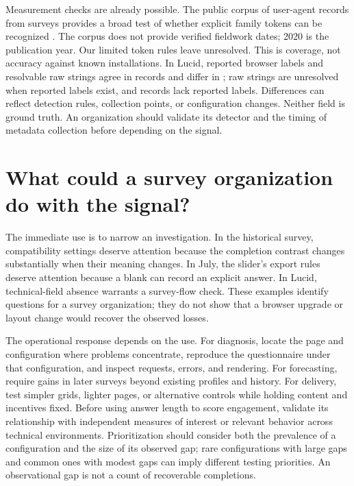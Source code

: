\documentclass[11pt]{article}
\begin{document}
Measurement checks are already possible. The public corpus of \JssN{} user-agent records from \JssSurveys{} surveys provides a broad test of whether explicit family tokens can be recognized \citep{rossmann2020}. The corpus does not provide verified fieldwork dates; 2020 is the publication year. Our limited token rules leave \CorpusUnknown{} unresolved. This is coverage, not accuracy against known installations. In Lucid, reported browser labels and resolvable raw strings agree in \ParserAgreement{} records and differ in \ParserDifferent{}; \ParserUnresolved{} raw strings are unresolved when reported labels exist, and \ParserMissing{} records lack reported labels. Differences can reflect detection rules, collection points, or configuration changes. Neither field is ground truth. An organization should validate its detector and the timing of metadata collection before depending on the signal.

\section{What could a survey organization do with the signal?}

The immediate use is to narrow an investigation. In the historical survey, compatibility settings deserve attention because the completion contrast changes substantially when their meaning changes. In July, the slider's export rules deserve attention because a blank can record an explicit answer. In Lucid, technical-field absence warrants a survey-flow check. These examples identify questions for a survey organization; they do not show that a browser upgrade or layout change would recover the observed losses.

The operational response depends on the use. For diagnosis, locate the page and configuration where problems concentrate, reproduce the questionnaire under that configuration, and inspect requests, errors, and rendering. For forecasting, require gains in later surveys beyond existing profiles and history. For delivery, test simpler grids, lighter pages, or alternative controls while holding content and incentives fixed. Before using answer length to score engagement, validate its relationship with independent measures of interest or relevant behavior across technical environments. Prioritization should consider both the prevalence of a configuration and the size of its observed gap; rare configurations with large gaps and common ones with modest gaps can imply different testing priorities. An observational gap is not a count of recoverable completions.
\end{document}

